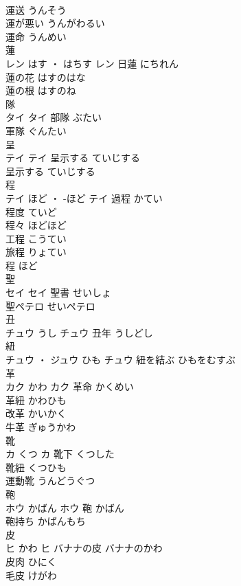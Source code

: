 \documentclass[8pt]{extreport}
\begin{document}
\begin{CJK}{UTF8}{min}
\\	運送	うんそう	
\\	運が悪い	うんがわるい	
\\	運命	うんめい	
\\	蓮	
\\	レン	はす ・ はちす	レン	日蓮	にちれん	
\\	蓮の花	はすのはな	
\\	蓮の根	はすのね	
\\	隊	
\\	タイ		タイ	部隊	ぶたい	
\\	軍隊	ぐんたい	
\\	呈	
\\	テイ		テイ	呈示する	ていじする	
\\	呈示する	ていじする	
\\	程	
\\	テイ	ほど ・ -ほど	テイ	過程	かてい	
\\	程度	ていど	
\\	程々	ほどほど	
\\	工程	こうてい	
\\	旅程	りょてい	
\\	程	ほど	
\\	聖	
\\	セイ		セイ	聖書	せいしょ	
\\	聖ペテロ	せいペテロ	
\\	丑	
\\	チュウ	うし	チュウ	丑年	うしどし	
\\	紐	
\\	チュウ ・ ジュウ	ひも	チュウ													紐を結ぶ	ひもをむすぶ	
\\	革	
\\	カク	かわ	カク	革命	かくめい	
\\	革紐	かわひも	
\\	改革	かいかく	
\\	牛革	ぎゅうかわ	
\\	靴	
\\	カ	くつ	カ	靴下	くつした	
\\	靴紐	くつひも	
\\	運動靴	うんどうぐつ	
\\	鞄	
\\	ホウ	かばん	ホウ													鞄	かばん	
\\	鞄持ち	かばんもち	
\\	皮	
\\	ヒ	かわ	ヒ	バナナの皮	バナナのかわ	
\\	皮肉	ひにく	
\\	毛皮	けがわ	

\end{CJK}
\end{document}
